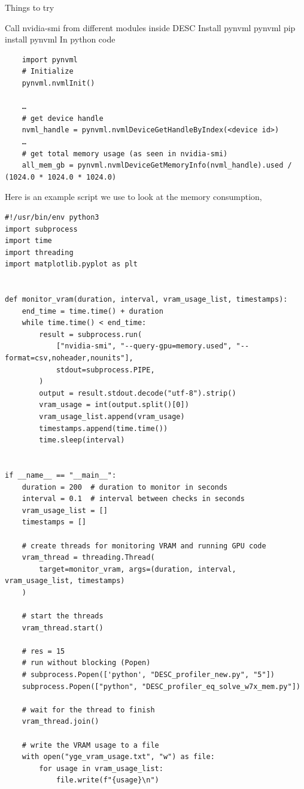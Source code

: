 Things to try

Call nvidia-smi from different modules inside DESC
Install pynvml pynvml
pip install pynvml
In python code
\begin{verbatim}
    import pynvml
    # Initialize
    pynvml.nvmlInit()
    
    …
    # get device handle 
    nvml_handle = pynvml.nvmlDeviceGetHandleByIndex(<device id>)
    …
    # get total memory usage (as seen in nvidia-smi)
    all_mem_gb = pynvml.nvmlDeviceGetMemoryInfo(nvml_handle).used / (1024.0 * 1024.0 * 1024.0)
\end{verbatim}

Here is an example script we use to look at the memory consumption,
\begin{verbatim}
#!/usr/bin/env python3
import subprocess
import time
import threading
import matplotlib.pyplot as plt


def monitor_vram(duration, interval, vram_usage_list, timestamps):
    end_time = time.time() + duration
    while time.time() < end_time:
        result = subprocess.run(
            ["nvidia-smi", "--query-gpu=memory.used", "--format=csv,noheader,nounits"],
            stdout=subprocess.PIPE,
        )
        output = result.stdout.decode("utf-8").strip()
        vram_usage = int(output.split()[0])
        vram_usage_list.append(vram_usage)
        timestamps.append(time.time())
        time.sleep(interval)


if __name__ == "__main__":
    duration = 200  # duration to monitor in seconds
    interval = 0.1  # interval between checks in seconds
    vram_usage_list = []
    timestamps = []

    # create threads for monitoring VRAM and running GPU code
    vram_thread = threading.Thread(
        target=monitor_vram, args=(duration, interval, vram_usage_list, timestamps)
    )

    # start the threads
    vram_thread.start()

    # res = 15
    # run without blocking (Popen)
    # subprocess.Popen(['python', "DESC_profiler_new.py", "5"])
    subprocess.Popen(["python", "DESC_profiler_eq_solve_w7x_mem.py"])

    # wait for the thread to finish
    vram_thread.join()

    # write the VRAM usage to a file
    with open("yge_vram_usage.txt", "w") as file:
        for usage in vram_usage_list:
            file.write(f"{usage}\n")


\end{verbatim}
